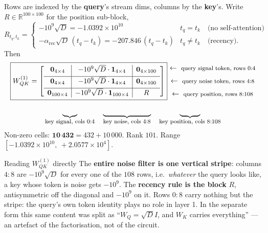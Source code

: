 \documentclass[11pt]{article}
\newcommand{\R}{\mathbb{R}}
\newcommand{\Wqk}{W_{QK}}
\newcommand{\Wq}{W_Q}
\newcommand{\Wk}{W_K}
\newcommand{\sd}{\sqrt{D}}
\newcommand{\rowlab}[1]{\ \leftarrow\ \text{\footnotesize #1}}
\newcommand{\collab}[1]{\text{\footnotesize #1}}
\begin{document}
Rows are indexed by the \textbf{query}'s stream dims, columns by the \textbf{key}'s. Write
$R\in\R^{100\times100}$ for the position sub-block,
\begin{equation}
R_{t_q,t_k}=
\begin{cases}
-10^{9}\sd=-1.0392\times10^{10} & t_q=t_k \quad\text{(no self-attention)}\\[2pt]
-\alpha_{\mathrm{rec}}\sd\,(t_q-t_k)=-207.846\,(t_q-t_k) & t_q\neq t_k \quad\text{(recency)} .
\end{cases}
\end{equation}
Then
\begin{equation}
\boxed{
\Wqk^{(1)}=
\left[
\begin{array}{c|c|c}
\bm{0}_{4\times4} & -10^{9}\sd\cdot\bm{1}_{4\times4} & \bm{0}_{4\times100}\\[3pt]
\hline
\bm{0}_{4\times4} & -10^{9}\sd\cdot\bm{1}_{4\times4} & \bm{0}_{4\times100}\\[3pt]
\hline
\bm{0}_{100\times4} & -10^{9}\sd\cdot\bm{1}_{100\times4} & R
\end{array}
\right]}
\begin{matrix}
\rowlab{query signal token, rows $0{:}4$}\\[6pt]
\rowlab{query noise token, rows $4{:}8$}\\[6pt]
\rowlab{query position, rows $8{:}108$}
\end{matrix}
\end{equation}
\[
\underbrace{\phantom{\bm{0}_{4\times4}}}_{\collab{key signal, cols $0{:}4$}}\quad
\underbrace{\phantom{-10^{9}\sd\cdot\bm{1}_{4\times4}}}_{\collab{key noise, cols $4{:}8$}}\quad
\underbrace{\phantom{\bm{0}_{4\times100}}}_{\collab{key position, cols $8{:}108$}}
\]
Non-zero cells: $\bm{10\,432}=432+10\,000$. Rank $101$. Range
$[-1.0392\times10^{10},\ +2.0577\times10^{4}]$.

\begin{interpbox}{Reading $\Wqk^{(1)}$ directly}
The \textbf{entire noise filter is one vertical stripe}: columns $4{:}8$ are $-10^9\sd$ for every
one of the $108$ rows, i.e.\ \emph{whatever} the query looks like, a key whose token is noise gets
$-10^9$. The \textbf{recency rule is the block} $R$, antisymmetric off the diagonal and $-10^9$ on
it. Rows $0{:}8$ carry nothing but the stripe: the query's own token identity plays no role in
layer 1. In the separate form this same content was split as ``$\Wq=\sd I$, and $\Wk$ carries
everything'' --- an artefact of the factorisation, not of the circuit.
\end{interpbox}
\end{document}
